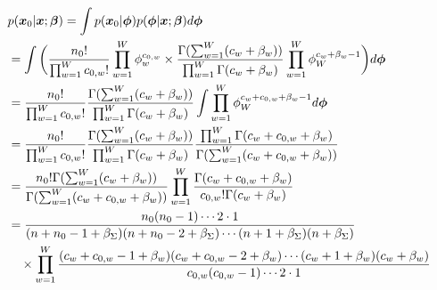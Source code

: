 \documentclass[aspectratio=169,unicode,dvipdfmx,14pt]{beamer}
\begin{document}
\begin{frame}
\FontMath
\begin{align}
& p(\bm{x}_0|\bm{x};\bm{\beta}) = \int p(\bm{x}_0|\bm{\phi})p(\bm{\phi}|\bm{x};\bm{\beta}) d\bm{\phi}
\notag \\ & =
\int \bigg(
\frac{n_0!}{\prod_{w=1}^W c_{0,w}!} \prod_{w=1}^W \phi_w^{c_{0,w}} \times
\frac{\Gamma(\sum_{w=1}^W (c_w + \beta_w))}{\prod_{w=1}^W \Gamma(c_w + \beta_w)}
\prod_{w=1}^W \phi_W^{c_w + \beta_w - 1} \bigg) d\bm{\phi}
\notag \\ & =
\frac{n_0!}{\prod_{w=1}^W c_{0,w}!}
\frac{\Gamma(\sum_{w=1}^W (c_w + \beta_w))}{\prod_{w=1}^W \Gamma(c_w + \beta_w)}
\int \prod_{w=1}^W \phi_W^{c_w + c_{0,w} + \beta_w - 1} d\bm{\phi}
\notag \\ & =
\frac{n_0!}{\prod_{w=1}^W c_{0,w}!}
\frac{\Gamma(\sum_{w=1}^W (c_w + \beta_w))}{\prod_{w=1}^W \Gamma(c_w + \beta_w)}
\frac{\prod_{w=1}^W \Gamma(c_w+c_{0,w}+\beta_w)}
{\Gamma( \sum_{w=1}^W (c_w + c_{0,w} + \beta_w) )}
\notag \\ & =
\frac{n_0! \Gamma(\sum_{w=1}^W (c_w + \beta_w))}{\Gamma( \sum_{w=1}^W (c_w + c_{0,w} + \beta_w) )}
\prod_{w=1}^W
\frac{\Gamma(c_w+c_{0,w}+\beta_w)}{c_{0,w}!\Gamma(c_w + \beta_w)}
\notag \\ & =
\frac{n_0 (n_0-1) \cdots 2 \cdot 1}{( n+n_0-1+\beta_\Sigma)( n+n_0-2+\beta_\Sigma) \cdots (n+1+\beta_\Sigma)(n + \beta_\Sigma)}
\notag \\ & \mbox{ \ \ } \times
\prod_{w=1}^W
\frac{(c_w+c_{0,w}-1+\beta_w)(c_w+c_{0,w}-2+\beta_w)\cdots(c_w+1+\beta_w)(c_w+\beta_w) }
{c_{0,w} (c_{0,w} - 1) \cdots 2 \cdot 1}
\end{align}
\end{frame}
\end{document}
